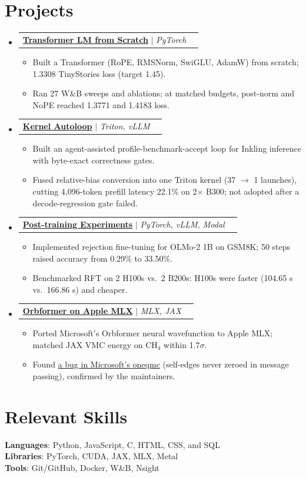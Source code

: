\documentclass[letterpaper,11pt]{article}
\makeatletter
\newcommand{\resumeItem}[1]{\item\small{{#1 \vspace{-2pt}}}}
\newcommand{\resumeProjectHeading}[2]{\item\begin{tabular*}{0.97\textwidth}{l@{\extracolsep{\fill}}r}\small#1 & #2 \\ \end{tabular*}\vspace{-7pt}}
\newcommand{\resumeSubHeadingListStart}{\begin{itemize}[leftmargin=0.15in, label={}]}
\newcommand{\resumeSubHeadingListEnd}{\end{itemize}}
\newcommand{\resumeItemListStart}{\begin{itemize}}
\newcommand{\resumeItemListEnd}{\end{itemize}\vspace{-5pt}}
\makeatother
\begin{document}
\section{Projects}
\resumeSubHeadingListStart
  \resumeProjectHeading{\textbf{\href{https://github.com/AMX07/cs336-assignment1-basics}{Transformer LM from Scratch}} $|$ \emph{PyTorch}}{}
  \resumeItemListStart
    \resumeItem{Built a Transformer (RoPE, RMSNorm, SwiGLU, AdamW) from scratch; 1.3308 TinyStories loss (target 1.45).}
    \resumeItem{Ran 27 W\&B sweeps and ablations; at matched budgets, post-norm and NoPE reached 1.3771 and 1.4183 loss.}
  \resumeItemListEnd
  \resumeProjectHeading{\textbf{\href{https://github.com/AMX07/inkling-kernel-autoloop}{Kernel Autoloop}} $|$ \emph{Triton, vLLM}}{}
  \resumeItemListStart
    \resumeItem{Built an agent-assisted profile-benchmark-accept loop for Inkling inference with byte-exact correctness gates.}
    \resumeItem{Fused relative-bias conversion into one Triton kernel (37 $\rightarrow$ 1 launches), cutting 4,096-token prefill latency 22.1\% on 2$\times$ B300; not adopted after a decode-regression gate failed.}
  \resumeItemListEnd
  \resumeProjectHeading{\textbf{\href{https://github.com/AMX07/post-training-exp}{Post-training Experiments}} $|$ \emph{PyTorch, vLLM, Modal}}{}
  \resumeItemListStart
    \resumeItem{Implemented rejection fine-tuning for OLMo-2 1B on GSM8K; 50 steps raised accuracy from 0.29\% to 33.50\%.}
    \resumeItem{Benchmarked RFT on 2 H100s vs.\ 2 B200s: H100s were faster (104.65 s vs.\ 166.86 s) and cheaper.}
  \resumeItemListEnd
  \resumeProjectHeading{\textbf{\href{https://github.com/AMX07/mlxqmc}{Orbformer on Apple MLX}} $|$ \emph{MLX, JAX}}{}
  \resumeItemListStart
    \resumeItem{Ported Microsoft's Orbformer neural wavefunction to Apple MLX; matched JAX VMC energy on CH$_4$ within 1.7$\sigma$.}
    \resumeItem{Found \href{https://github.com/microsoft/oneqmc/issues/11}{a bug in Microsoft's oneqmc} (self-edges never zeroed in message passing), confirmed by the maintainers.}
  \resumeItemListEnd
\resumeSubHeadingListEnd
\section{Relevant Skills}
\begin{itemize}[leftmargin=0.15in, label={}]
\small{\item{\textbf{Languages}: Python, JavaScript, C, HTML, CSS, and SQL \\ \textbf{Libraries}: PyTorch, CUDA, JAX, MLX, Metal \\ \textbf{Tools}: Git/GitHub, Docker, W\&B, Nsight}}
\end{itemize}
\end{document}
